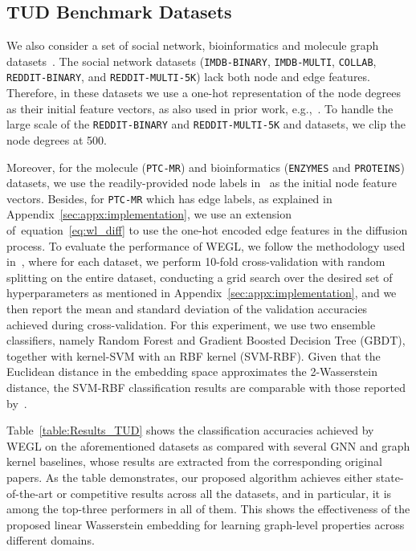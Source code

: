 \documentclass[table]{article} \usepackage{iclr2021_conference,times}
\def\eqref#1{equation~\ref{#1}}
\begin{document}
\subsection{TUD Benchmark Datasets}\label{sec:tud_results}
\vspace{-0.05in}

We also consider a set of social network, bioinformatics and molecule graph datasets~\citep{KKMMN2016}. The social network datasets (\texttt{IMDB-BINARY}, \texttt{IMDB-MULTI}, \texttt{COLLAB}, \texttt{REDDIT-BINARY}, and \texttt{REDDIT-MULTI-5K}) lack both node and edge features. Therefore, in these datasets we use a one-hot representation of the node degrees as their initial feature vectors, as also used in prior work, e.g.,~\citep{xu2018how}. To handle the large scale of the \texttt{REDDIT-BINARY} and \texttt{REDDIT-MULTI-5K} and datasets, we clip the node degrees at 500.

Moreover, for the molecule (\texttt{PTC-MR}) and bioinformatics (\texttt{ENZYMES} and \texttt{PROTEINS}) datasets, we use the readily-provided node labels in~\citep{KKMMN2016} as the initial node feature vectors. Besides, for \texttt{PTC-MR} which has edge labels, as explained in Appendix~\ref{sec:appx:implementation}, we use an extension of~\eqref{eq:wl_diff} to use the one-hot encoded edge features in the diffusion process. To evaluate the performance of WEGL, we follow the methodology used in~\citep{yanardag2015deep,niepert2016learning,xu2018how}, where for each dataset, we perform 10-fold cross-validation with random splitting on the entire dataset, conducting a grid search over the desired set of hyperparameters as mentioned in Appendix~\ref{sec:appx:implementation}, and we then report the mean and standard deviation of the validation accuracies achieved during cross-validation. For this experiment, we use two ensemble classifiers, namely Random Forest and Gradient Boosted Decision Tree (GBDT), together with kernel-SVM with an RBF kernel (SVM-RBF). Given that the Euclidean distance in the embedding space approximates the 2-Wasserstein distance, the SVM-RBF classification results are comparable with those reported by~\cite{togninalli2019wasserstein}.

Table~\ref{table:Results_TUD} shows the classification accuracies achieved by WEGL on the aforementioned datasets as compared with several GNN and graph kernel baselines, whose results are extracted from the corresponding original papers. As the table demonstrates, our proposed algorithm achieves either state-of-the-art or competitive results across all the datasets, and in particular, it is among the top-three performers in all of them. This shows the effectiveness of the proposed linear Wasserstein embedding for learning graph-level properties across different domains.
\end{document}
